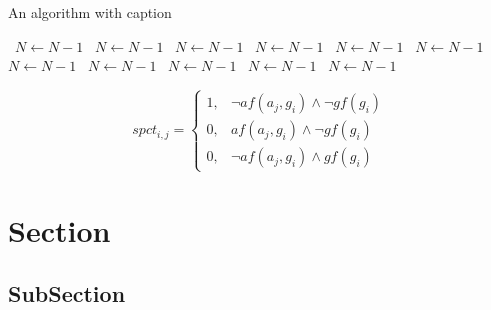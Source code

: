 \documentclass[a4paper]{article}
\begin{document}
\begin{algorithm}
\caption{An algorithm with caption}
\begin{algorithmic}
\    \State $N \gets N - 1$
\    \State $N \gets N - 1$
\    \State $N \gets N - 1$
\    \State $N \gets N - 1$
\    \State $N \gets N - 1$
\    \State $N \gets N - 1$
\    \State $N \gets N - 1$
\    \State $N \gets N - 1$
\    \State $N \gets N - 1$
\    \State $N \gets N - 1$
\    \State $N \gets N - 1$
\EndWhile
\end{algorithmic}
\end{algorithm}

\begin{equation}
spct_{i,j} =
\begin{cases}
1, & \text{$\neg af(a_j,g_i) \wedge \neg gf(g_i)$}\\
0, & \text{$af(a_j,g_i) \wedge \neg gf(g_i)$}\\
0, & \text{$\neg af(a_j,g_i) \wedge gf(g_i)$}
\end{cases}
\end{equation}

\section{Section}

\subsection{SubSection}
\end{document}
